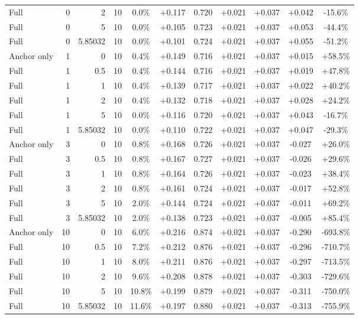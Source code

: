 \begin{table}[htbp]
\begin{tabular}{lrrrccccccc}
Full & 0 & 2 & 10 & 0.0\% & +0.117 & 0.720 & +0.021 & +0.037 & +0.042 & -15.6\% \\
Full & 0 & 5 & 10 & 0.0\% & +0.105 & 0.723 & +0.021 & +0.037 & +0.053 & -44.4\% \\
Full & 0 & 5.85032 & 10 & 0.0\% & +0.101 & 0.724 & +0.021 & +0.037 & +0.055 & -51.2\% \\
Anchor only & 1 & 0 & 10 & 0.4\% & +0.149 & 0.716 & +0.021 & +0.037 & +0.015 & +58.5\% \\
Full & 1 & 0.5 & 10 & 0.4\% & +0.144 & 0.716 & +0.021 & +0.037 & +0.019 & +47.8\% \\
Full & 1 & 1 & 10 & 0.4\% & +0.139 & 0.717 & +0.021 & +0.037 & +0.022 & +40.2\% \\
Full & 1 & 2 & 10 & 0.4\% & +0.132 & 0.718 & +0.021 & +0.037 & +0.028 & +24.2\% \\
Full & 1 & 5 & 10 & 0.0\% & +0.116 & 0.720 & +0.021 & +0.037 & +0.043 & -16.7\% \\
Full & 1 & 5.85032 & 10 & 0.0\% & +0.110 & 0.722 & +0.021 & +0.037 & +0.047 & -29.3\% \\
Anchor only & 3 & 0 & 10 & 0.8\% & +0.168 & 0.726 & +0.021 & +0.037 & -0.027 & +26.0\% \\
Full & 3 & 0.5 & 10 & 0.8\% & +0.167 & 0.727 & +0.021 & +0.037 & -0.026 & +29.6\% \\
Full & 3 & 1 & 10 & 0.8\% & +0.164 & 0.726 & +0.021 & +0.037 & -0.023 & +38.4\% \\
Full & 3 & 2 & 10 & 0.8\% & +0.161 & 0.724 & +0.021 & +0.037 & -0.017 & +52.8\% \\
Full & 3 & 5 & 10 & 2.0\% & +0.144 & 0.724 & +0.021 & +0.037 & -0.011 & +69.2\% \\
Full & 3 & 5.85032 & 10 & 2.0\% & +0.138 & 0.723 & +0.021 & +0.037 & -0.005 & +85.4\% \\
Anchor only & 10 & 0 & 10 & 6.0\% & +0.216 & 0.874 & +0.021 & +0.037 & -0.290 & -693.8\% \\
Full & 10 & 0.5 & 10 & 7.2\% & +0.212 & 0.876 & +0.021 & +0.037 & -0.296 & -710.7\% \\
Full & 10 & 1 & 10 & 8.0\% & +0.211 & 0.876 & +0.021 & +0.037 & -0.297 & -713.5\% \\
Full & 10 & 2 & 10 & 9.6\% & +0.208 & 0.878 & +0.021 & +0.037 & -0.303 & -729.6\% \\
Full & 10 & 5 & 10 & 10.8\% & +0.199 & 0.879 & +0.021 & +0.037 & -0.311 & -750.0\% \\
Full & 10 & 5.85032 & 10 & 11.6\% & +0.197 & 0.880 & +0.021 & +0.037 & -0.313 & -755.9\% \\

\end{tabular}
\end{table}
